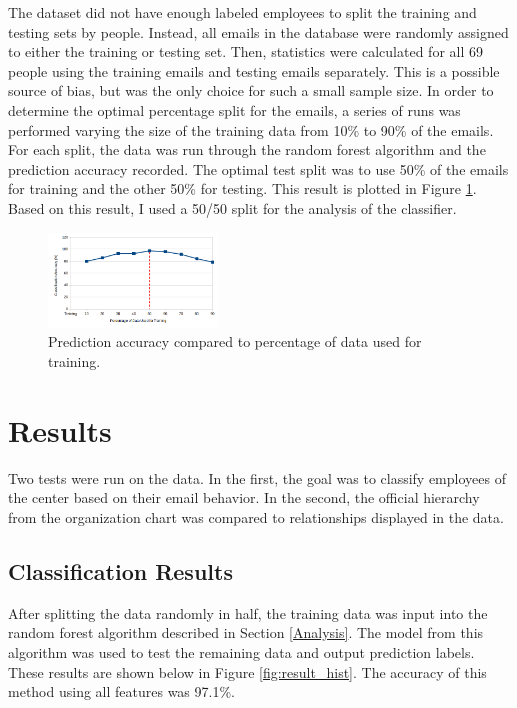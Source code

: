 \documentclass{article}
\begin{document}
The dataset did not have enough labeled employees to split the training and testing sets by people.  Instead, all emails in the database were randomly assigned to either the training or testing set.  Then, statistics were calculated for all 69 people using the training emails and testing emails separately.  This is a possible source of bias, but was the only choice for such a small sample size.  In order to determine the optimal percentage split for the emails, a series of runs was performed varying the size of the training data from 10\% to 90\% of the emails.  For each split, the data was run through the random forest algorithm and the prediction accuracy recorded.  The optimal test split was to use 50\% of the emails for training and the other 50\% for testing.  This result is plotted in Figure \ref{fig:split_analysis}.  Based on this result, I used a 50/50 split for the analysis of the classifier.

\begin{figure}[H]
    \centering
        \includegraphics[width=0.4\textwidth]{SplitAnalysisWithLine}
        \caption{Prediction accuracy compared to percentage of data used for training.}
        \label{fig:split_analysis}
\end{figure}



\section{Results} \label{Results}
Two tests were run on the data.  In the first, the goal was to classify employees of the center based on their email behavior.  In the second, the official hierarchy from the organization chart was compared to relationships displayed in the data.

\subsection{Classification Results}
After splitting the data randomly in half, the training data was input into the random forest algorithm described in Section \ref{Analysis}.  The model from this algorithm was used to test the remaining data and output prediction labels.  These results are shown below in Figure \ref{fig:result_hist}.  The accuracy of this method using all features was 97.1\%.
\end{document}
